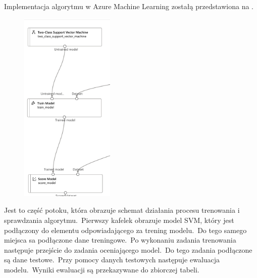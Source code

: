 Implementacja algorytmu w Azure Machine Learning zostałą przedstawiona na .

\begin{figure}[H]
    \centering
    \includegraphics[width=0.4\textwidth]{images/svm_pipe}
    \label{fig:svm-pipe}
\end{figure}

Jest to część potoku, która obrazuje schemat działania procesu trenowania i sprawdzania algorytmu.\ Pierwszy kafelek obrazuje model SVM, który jest podłączony do elementu odpowiadającego za trening modelu.\ Do tego samego miejsca sa podłączone dane treningowe.\ Po wykonaniu zadania trenowania następuje przejście do zadania oceniającego model.\ Do tego zadania podłączone są dane testowe.\ Przy pomocy danych testowych następuje ewaluacja modelu.\ Wyniki ewaluacji są przekazywane do zbiorczej tabeli.

